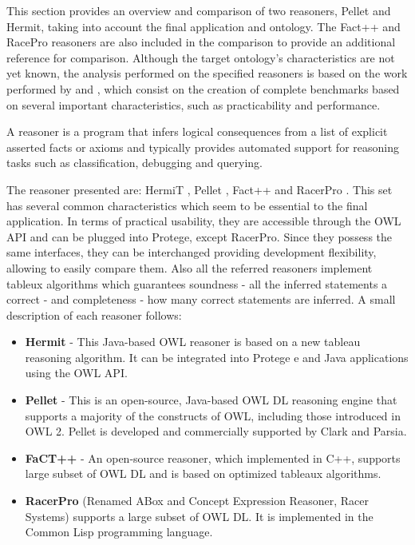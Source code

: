 
This section provides an overview and comparison of two reasoners, Pellet and Hermit, taking into account the final application and ontology. The Fact++ and RacePro reasoners are also included in the comparison to provide an additional reference for comparison.
Although the target ontology's characteristics are not yet known, the analysis performed on the specified reasoners is based on the work performed by \cite{Dentler2011} and \cite{Bock2008}, which consist on the creation of complete benchmarks based on several important characteristics, such as practicability and performance.

A reasoner is a program that infers logical consequences from a list of explicit asserted facts or axioms and typically provides automated support for reasoning tasks such as classification, debugging and querying.

The reasoner presented are: HermiT \cite{1_hermitreasoner}, Pellet \cite{2_stardog-union/pellet_2016}, Fact++ \cite{3_fact++reasoner} and RacerPro \cite{4_racerpro_2016}. This set has several common characteristics which seem to be essential to the final application. In terms of practical usability, they are accessible through the OWL API and can be plugged into Protege, except RacerPro. Since they possess the same interfaces, they can be interchanged providing development flexibility, allowing to easily compare them. Also all the referred reasoners implement tableux algorithms which guarantees soundness - all the inferred statements a correct - and completeness - how many correct statements are inferred. A small description of each reasoner follows:

\begin{itemize}
\item \textbf{Hermit} - This Java-based OWL reasoner is based on a new tableau reasoning algorithm. It can be integrated into Protege e and Java applications using the OWL API.
\item \textbf{Pellet} - This is an open-source, Java-based OWL DL reasoning engine that supports a majority of the constructs of OWL, including those introduced in OWL 2. Pellet is developed and commercially supported by Clark and Parsia.
\item \textbf{FaCT++} - An open-source reasoner, which implemented in C++, supports large subset of OWL DL and is based on optimized tableaux algorithms.
\item \textbf{RacerPro} (Renamed ABox and Concept Expression
Reasoner, Racer Systems) supports a large subset of OWL DL. It is implemented in the Common Lisp programming language.
\end{itemize}

